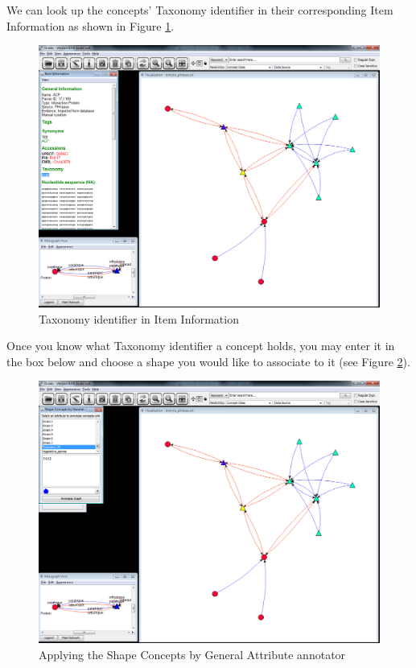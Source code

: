 We can look up the concepts' Taxonomy identifier in their corresponding Item Information as shown in Figure \ref{fig:bot_taxid_lookup1}.

\begin{figure}[H]
\centering
\includegraphics[scale=0.35]{images/Oct12/app2fig7.png} 
\caption{Taxonomy identifier in Item Information}
\label{fig:bot_taxid_lookup1}
\end{figure}

Once you know what Taxonomy identifier a concept holds, you may enter it in the box below and choose a shape you would like to associate to it (see Figure \ref{fig:bot_shape_before}).

\begin{figure}[H]
\centering
\includegraphics[scale=0.35]{images/Oct12/app2fig8.png} 
\caption{Applying the Shape Concepts by General Attribute annotator}
\label{fig:bot_shape_before}
\end{figure}

